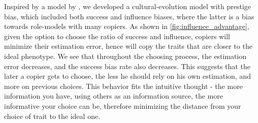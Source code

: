 \documentclass[12pt]{extarticle}
\begin{document}
Inspired by a model by \citet{evolutionBook}, we developed a cultural-evolution model with prestige bias, which included both success and influence biases, where the latter is a bias towards role-models with many copiers.
As shown in \cref{fig:influence_advantage}, given the option to choose the ratio of success and influence, copiers will minimize their estimation error, hence will copy the traits that are closer to the ideal phenotype. We see that throughout the choosing process, the estimation error decreases, and the success bias rate also decreases. This suggests that the later a copier gets to choose, the less he should rely on his own estimation, and more on previous choices.
This behavior fits the intuitive thought - the more information you have, using others as an information source, the more informative your choice can be, therefore minimizing the distance from your choice of trait to the ideal one.
\end{document}
